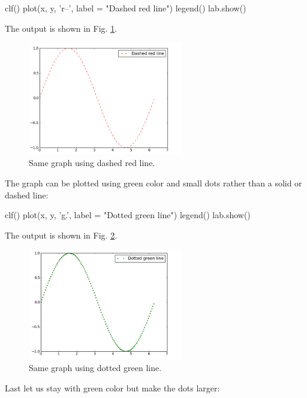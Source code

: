 \begin{bluecode}
clf()
plot(x, y, 'r--', label = "Dashed red line")
legend()
lab.show()
\end{bluecode}
The output is shown in Fig. \ref{fig:plot3}.\\[-7mm]


\begin{figure}[!ht]
\begin{center}
\includegraphics[width=0.6\textwidth]{imgp/plot3.png}
\end{center}
\vspace{-6mm}
\caption{Same graph using dashed red line.}
\vspace{-1cm}
\label{fig:plot3}
\end{figure}
\newpage
\noindent
The graph can be plotted using green color and small dots rather than 
a solid or dashed line:

\begin{bluecode}
clf()
plot(x, y, 'g.', label = "Dotted green line")
legend()
lab.show()
\end{bluecode}
The output is shown in Fig. \ref{fig:plot4}.

\begin{figure}[!ht]
\begin{center}
\includegraphics[width=0.6\textwidth]{imgp/plot4.png}
\end{center}
\vspace{-6mm}
\caption{Same graph using dotted green line.}
\label{fig:plot4}
\end{figure}
\noindent
\noindent
Last let us stay with green color but make the dots larger:

